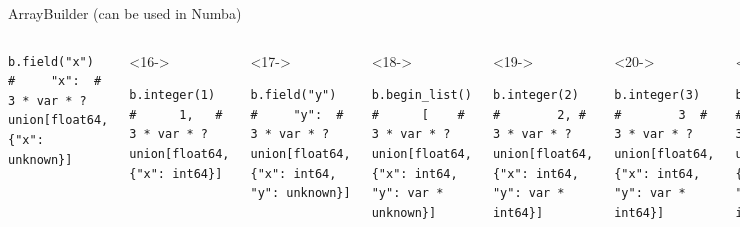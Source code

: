 \documentclass[aspectratio=169]{beamer}
\begin{document}
\begin{frame}[fragile]{ArrayBuilder (can be used in Numba)}
\begin{columns}
\begin{uncoverenv}
\begin{verbatim}
b.field("x")      #     "x":  # 3 * var * ?union[float64, {"x": unknown}]
\end{verbatim}
\end{uncoverenv}
\vspace{-0.43 cm}
\begin{uncoverenv}<16->
\begin{verbatim}
b.integer(1)      #      1,   # 3 * var * ?union[float64, {"x": int64}]
\end{verbatim}
\end{uncoverenv}
\vspace{-0.43 cm}
\begin{uncoverenv}<17->
\begin{verbatim}
b.field("y")      #     "y":  # 3 * var * ?union[float64, {"x": int64, "y": unknown}]
\end{verbatim}
\end{uncoverenv}
\vspace{-0.43 cm}
\begin{uncoverenv}<18->
\begin{verbatim}
b.begin_list()    #      [    # 3 * var * ?union[float64, {"x": int64, "y": var * unknown}]
\end{verbatim}
\end{uncoverenv}
\vspace{-0.43 cm}
\begin{uncoverenv}<19->
\begin{verbatim}
b.integer(2)      #        2, # 3 * var * ?union[float64, {"x": int64, "y": var * int64}]
\end{verbatim}
\end{uncoverenv}
\vspace{-0.43 cm}
\begin{uncoverenv}<20->
\begin{verbatim}
b.integer(3)      #        3  # 3 * var * ?union[float64, {"x": int64, "y": var * int64}]
\end{verbatim}
\end{uncoverenv}
\vspace{-0.43 cm}
\begin{uncoverenv}<21->
\begin{verbatim}
b.end_list()      #      ]    # 3 * var * ?union[float64, {"x": int64, "y": var * int64}]
\end{verbatim}
\end{uncoverenv}
\vspace{-0.43 cm}
\begin{uncoverenv}<22->
\begin{verbatim}

\end{verbatim}
\end{uncoverenv}
\end{columns}
\end{frame}
\end{document}
